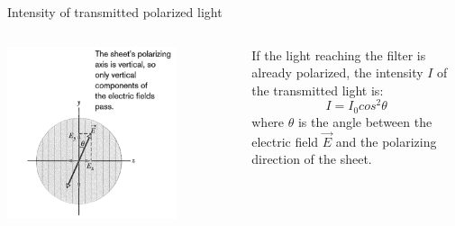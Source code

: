 \begin{frame}{Intensity of transmitted polarized light}
\begin{columns}
  \begin{column}{0.40\textwidth}
    \begin{center}
       \includegraphics[width=0.75\textwidth]{./images/schematics/polarized_light_sent_through_filter.png}\\
    \end{center}
  \end{column}
  \begin{column}{0.60\textwidth}
      If the light reaching the filter is already polarized,
      the intensity $I$ of the transmitted light is:
      \begin{equation*}
        I = I_0 cos^2\theta
      \end{equation*}
      where $\theta$ is the angle between the electric field $\vec{E}$
      and the polarizing direction of the sheet.
  \end{column}
\end{columns}


\end{frame}

%
%
%

